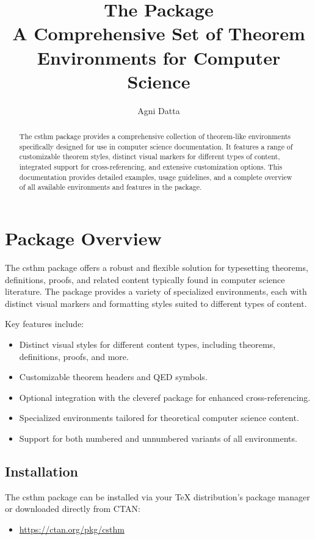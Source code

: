 \documentclass{amsart}
\title[The \pkg{csthm} Package]{The \pkg{csthm} Package\\[1ex]\large A Comprehensive Set of Theorem Environments for Computer Science}
\author{Agni Datta}
\newcommand{\pkg}[1]{\textsf{#1}}
\begin{document}
\begin{abstract}
	The \pkg{csthm} package provides a comprehensive collection of theorem-like environments specifically designed for use in computer science documentation. It features a range of customizable theorem styles, distinct visual markers for different types of content, integrated support for cross-referencing, and extensive customization options. This documentation provides detailed examples, usage guidelines, and a complete overview of all available environments and features in the package.
\end{abstract}

\maketitle

\tableofcontents

\section{Package Overview}

The \pkg{csthm} package offers a robust and flexible solution for typesetting theorems, definitions, proofs, and related content typically found in computer science literature. The package provides a variety of specialized environments, each with distinct visual markers and formatting styles suited to different types of content.

Key features include:
\begin{itemize}
	\item Distinct visual styles for different content types, including theorems, definitions, proofs, and more.
	\item Customizable theorem headers and QED symbols.
	\item Optional integration with the \pkg{cleveref} package for enhanced cross-referencing.
	\item Specialized environments tailored for theoretical computer science content.
	\item Support for both numbered and unnumbered variants of all environments.
\end{itemize}

\subsection{Installation}

The \pkg{csthm} package can be installed via your TeX distribution's package manager or downloaded directly from CTAN:
\begin{itemize}
	\item \url{https://ctan.org/pkg/csthm}
\end{itemize}
\end{document}
